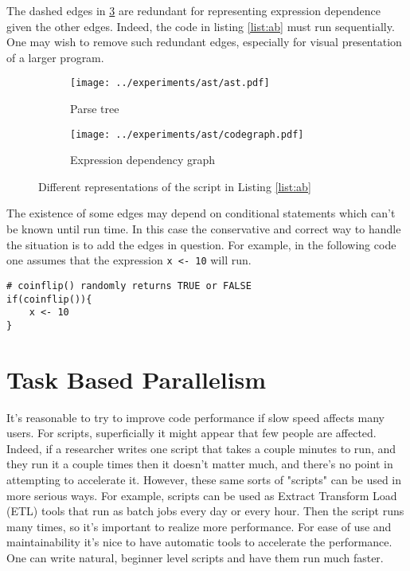 \documentclass[12pt]{article}
\begin{document}
The dashed edges in \ref{fig:codegraph} are redundant for representing
expression dependence given the other edges. Indeed, the code in
listing \ref{list:ab} must run sequentially. One may wish to remove such
redundant edges, especially for visual presentation of a larger program.



\begin{figure}
\centering
\begin{subfigure}{.6\textwidth}
    \centering
    \texttt{[image: ../experiments/ast/ast.pdf]}
    \caption{Parse tree}
    \label{fig:ast}
\end{subfigure}%
\begin{subfigure}{.4\textwidth}
  \centering
  \texttt{[image: ../experiments/ast/codegraph.pdf]}
  \caption{Expression dependency graph}
  \label{fig:codegraph}
\end{subfigure}
\caption{Different representations of the script in Listing \ref{list:ab}}
\end{figure}

The existence of some edges may depend on conditional statements which can't
be known until run time. In this case the conservative and correct way to
handle the situation is to add the edges in question. For example, in the
following code one assumes that the expression \texttt{x <- 10} will run.

\begin{verbatim}
# coinflip() randomly returns TRUE or FALSE
if(coinflip()){
    x <- 10
}
\end{verbatim}

\section{Task Based Parallelism}

It's reasonable to try to improve code performance if slow speed affects
many users. For scripts, superficially it might appear that few people are
affected. Indeed, if a researcher writes one script that takes a couple
minutes to run, and they run it a couple times then it doesn't matter much,
and there's no point in attempting to accelerate it.  However, these same
sorts of "scripts" can be used in more serious ways.  For example, scripts
can be used as Extract Transform Load (ETL) tools that run as batch jobs
every day or every hour. Then the script runs many times, so it's important
to realize more performance. For ease of use and maintainability it's nice
to have automatic tools to accelerate the performance. One can write
natural, beginner level scripts and have them run much faster.
\end{document}
